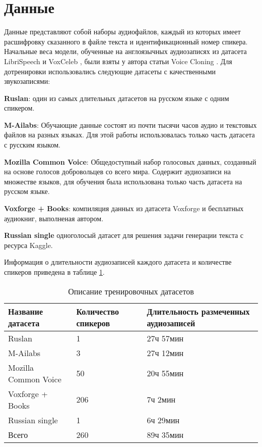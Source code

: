 \documentclass[oneside,final,14pt]{extreport}
\begin{document}
\section{Данные}
\label{chap:data}
Данные представляют собой наборы аудиофайлов, каждый из которых имеет расшифровку сказанного в файле текста и идентификационный номер спикера. Начальные веса модели, обученные на англоязычных аудиозаписях из датасета LibriSpeech \cite{bib:librispeech} и VoxCeleb \cite{bib:vox_celeb}, были взяты у автора статьи Voice Cloning \cite{bib:voice_cloning}.   Для дотренировки использовались следующие датасеты с качественными звукозаписями:

\textbf{Ruslan}:
один из самых длительных датасетов на русском языке с одним спикером\cite{bib:Ruslan}.

\textbf{M-Ailabs}:
Обучающие данные состоят из почти тысячи часов аудио и текстовых файлов на разных языках. Для этой работы использовалась только часть датасета с русским языком.

\textbf{Mozilla Common Voice}: 
Общедоступный набор голосовых данных, созданный на основе голосов добровольцев со всего мира\cite{bib:Mozilla}. Содержит аудиозаписи на множестве языков, для обучения была использована только часть датасета на русском языке.

\textbf{Voxforge + Books}:
компиляция данных из датасета Voxforge и бесплатных аудиокниг, выполненая автором\cite{bib:russian_voice_cloning}.


\textbf{Russian single}
одноголосый датасет для решения задачи генерации текста с ресурса Kaggle\cite{bib:russian_single}.

Информация о длительности аудиозаписей каждого датасета и количестве спикеров приведена в таблице \ref{table:data}.

\begin{table}[H] 
\caption{Описание тренировочных датасетов}
\label{table:data}
\begin{tabularx}{\textwidth}{|X|X|X|}
\hline
Название датасета
&
Количество спикеров
&
Длительность размеченных аудиозаписей
\\
\hline
Ruslan
&
 1
 &
 27ч 57мин
\\
\hline
M-Ailabs
&
3
&
27ч 12мин
\\
\hline
Mozilla Common Voice
&
50
&
20ч 55мин
\\
\hline
Voxforge + Books
&
206
&
7ч 2мин
\\
\hline
Russian single
&
1
&
6ч 29мин
\\
\hline
Всего
&
260
&
89ч 35мин
\\
\hline
\end{tabularx}
\end{table}
  
\end{document}
